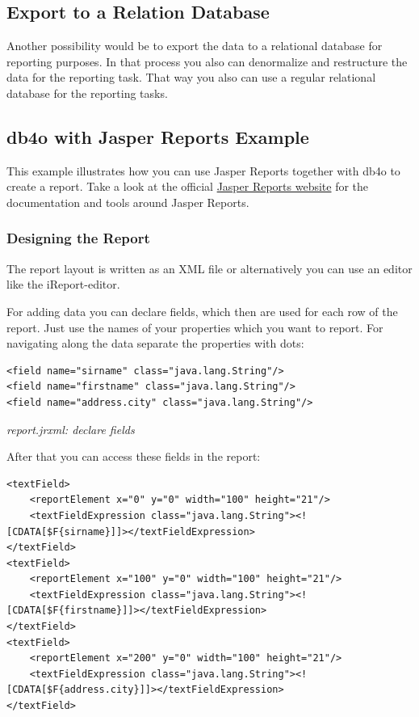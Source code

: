 \subsection*{Export to a Relation Database}

Another possibility would be to export the data to a relational database for reporting purposes. In that process you also can denormalize and restructure the data for the reporting task. That way you also can use a regular relational database for the reporting tasks.

\subsection{db4o with Jasper Reports Example}
\label{ref:platform-specific-issues-reporting-db4o-with-jasper}

This example illustrates how you can use Jasper Reports together with db4o to create a report. Take a look at the official \href{https://github.com/TIBCOSoftware/jasperreports}{Jasper Reports website} for the documentation and tools around Jasper Reports.

\subsubsection*{Designing the Report}

The report layout is written as an XML file or alternatively you can use an editor like the iReport-editor.

For adding data you can declare fields, which then are used for each row of the report. Just use the names of your properties which you want to report. For navigating along the data separate the properties with dots:

\begin{lstlisting}
<field name="sirname" class="java.lang.String"/>
<field name="firstname" class="java.lang.String"/>
<field name="address.city" class="java.lang.String"/>
\end{lstlisting}

{\small\itshape report.jrxml: declare fields\par}
\medskip

After that you can access these fields in the report:

\begin{lstlisting}
<textField>
    <reportElement x="0" y="0" width="100" height="21"/>
    <textFieldExpression class="java.lang.String"><![CDATA[$F{sirname}]]></textFieldExpression>
</textField>
<textField>
    <reportElement x="100" y="0" width="100" height="21"/>
    <textFieldExpression class="java.lang.String"><![CDATA[$F{firstname}]]></textFieldExpression>
</textField>
<textField>
    <reportElement x="200" y="0" width="100" height="21"/>
    <textFieldExpression class="java.lang.String"><![CDATA[$F{address.city}]]></textFieldExpression>
</textField>
\end{lstlisting}

